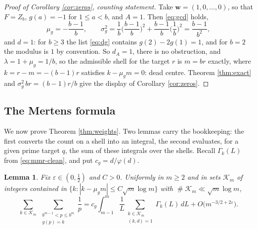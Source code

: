 \documentclass[11pt,reqno]{amsart}
\theoremstyle{plain}
\newtheorem{lemma}[theorem]{Lemma}
\theoremstyle{definition}
\DeclareMathOperator{\Card}{\#}
\begin{document}
\begin{proof}[Proof of Corollary \ref{cor:zeros}, counting statement]
Take $\mathbf w=(1,0,\dots,0)$, so that $F=Z_b$, $g(a)=-1$ for $1\le a<b$, and $A=1$. Then \eqref{eq:gcd} holds,
\[
\mu_g=-\frac{b-1}b,\qquad \sigma_g^{2}=\frac1b\Big(\frac{b-1}b\Big)^{2}+\frac{b-1}b\Big(\frac1b\Big)^{2}=\frac{b-1}{b^{2}},
\]
and $d=1$: for $b\ge3$ the list \eqref{eq:dg} contains $g(2)-2g(1)=1$, and for $b=2$ the modulus is $1$ by convention. So $d_A=1$, there is no obstruction, and $\lambda=1+\mu_g=1/b$, so the admissible shell for the target $r$ is $m=br$ exactly, where $k=r-m=-(b-1)r$ satisfies $k-\mu_gm=0$: dead centre. Theorem \ref{thm:exact} and $\sigma_g^{2}\,br=(b-1)r/b$ give the display of Corollary \ref{cor:zeros}.
\end{proof}

\subsection{The Mertens formula}
We now prove Theorem \ref{thm:weights}. Two lemmas carry the bookkeeping: the first converts the count on a shell into an integral, the second evaluates, for a given prime target $q$, the sum of these integrals over the shells. Recall $\Gamma_k(L)$ from \eqref{eq:mmr-clean}, and put $c_g=d/\varphi(d)$.

\begin{lemma}\label{lem:shell}
Fix $\varepsilon\in(0,\tfrac12)$ and $C>0$. Uniformly in $m\ge2$ and in sets $\mathcal K_m$ of integers contained in $\{k:|k-\mu_gm|\le C\sqrt m\log m\}$ with $\Card\mathcal K_m\ll\sqrt m\log m$,
\begin{equation}\label{eq:shell}
\sum_{k\in\mathcal K_m}\ \sum_{\substack{b^{m-1}<p\le b^{m}\\ g(p)=k}}\frac1p
=c_g\int_{m-1}^{m}\frac1{L}\sum_{\substack{k\in\mathcal K_m\\ (k,d)=1}}\Gamma_k(L)\,dL
+O\big(m^{-3/2+2\varepsilon}\big).
\end{equation}
\end{lemma}
\end{document}
